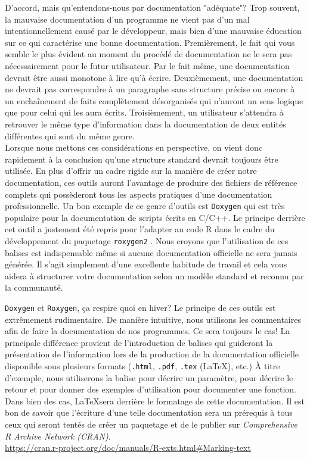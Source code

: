 D'accord, mais qu'entendons-nous par documentation "adéquate"? Trop souvent, la mauvaise documentation d'un programme ne vient pas d'un mal intentionnellement causé par le développeur, mais bien d'une mauvaise éducation sur ce qui caractérise une bonne documentation. Premièrement, le fait qui vous semble le plus évident au moment du procédé de documentation ne le sera pas nécessairement pour le futur utilisateur.  Par le fait même, une documentation devrait être aussi monotone à lire qu'à écrire. Deuxièmement, une documentation ne devrait pas correspondre à un paragraphe sans structure précise ou encore à un enchaînement de faits complètement désorganisés qui n'auront un sens logique que pour celui qui les aura écrits. Troisièmement, un utilisateur s'attendra à retrouver le même type d'information dans la documentation de deux entités différentes qui sont du même genre. \\

Lorsque nous mettons ces considérations en perspective, on vient donc rapidement à la conclusion qu'une structure standard devrait toujours être utilisée. En plus d'offrir un cadre rigide sur la manière de créer notre documentation, ces outils auront l'avantage de produire des fichiers de référence complets qui possèderont tous les aspects pratiques d'une documentation professionnelle. Un bon exemple de ce genre d'outils est \texttt{Doxygen} \cite{doxygen} qui est très populaire pour la documentation de scripts écrits en C/C++. Le principe derrière cet outil a justement été repris pour l'adapter au code R dans le cadre du développement du paquetage \texttt{roxygen2} \cite{roxygen2}. Nous croyons que l'utilisation de ces balises est indispensable même si aucune documentation officielle ne sera jamais générée. Il s'agit simplement d'une excellente habitude de travail et cela vous aidera à structurer votre documentation selon un modèle standard et reconnu par la communauté.\\

\begin{moreInfo}{\texttt{Doxygen} et \texttt{Roxygen}, ça respire quoi en hiver?}
	Le principe de ces outils est extrêmement rudimentaire. De manière intuitive, nous utilisons les commentaires afin de faire la documentation de nos programmes. Ce sera toujours le cas! La principale différence provient de l'introduction de balises qui guideront la présentation de l'information lors de la production de la documentation officielle disponible sous plusieurs formats (\texttt{.html}, \texttt{.pdf}, \texttt{.tex} (\LaTeX), etc.) À titre d'exemple, nous utiliserons la balise \@param pour décrire un paramètre, \@return pour décrire le retour et \@examples pour donner des exemples d'utilisation pour documenter une fonction. Dans bien des cas, \LaTeX  sera derrière le formatage de cette documentation. Il est bon de savoir que l'écriture d'une telle documentation sera un prérequis à tous ceux qui seront tentés de créer un paquetage et de le publier sur \emph{Comprehensive R Archive Network (CRAN)}. \\
	\url{https://cran.r-project.org/doc/manuals/R-exts.html#Marking-text}
\end{moreInfo}

